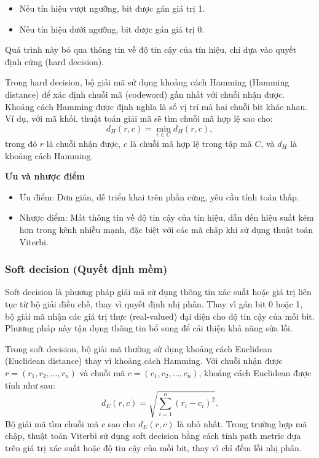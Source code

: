 \begin{itemize}[label=-]
	\item Nếu tín hiệu vượt ngưỡng, bit được gán giá trị 1.
	\item Nếu tín hiệu dưới ngưỡng, bit được gán giá trị 0.
\end{itemize}
Quá trình này bỏ qua thông tin về độ tin cậy của tín hiệu, chỉ dựa vào quyết định cứng (hard decision).

Trong hard decision, bộ giải mã sử dụng khoảng cách Hamming (Hamming distance) để xác định chuỗi mã (codeword) gần nhất với chuỗi nhận được. Khoảng cách Hamming được định nghĩa là số vị trí mà hai chuỗi bit khác nhau. Ví dụ, với mã khối, thuật toán giải mã sẽ tìm chuỗi mã hợp lệ sao cho:
\[
d_H({r}, {c}) = \min_{{c} \in C} d_H({r}, {c}),
\]
trong đó $r$ là chuỗi nhận được, $c$ là chuỗi mã hợp lệ trong tập mã $C$, và $d_H$ là khoảng cách Hamming.

\textbf{Ưu và nhược điểm}

\begin{itemize}[label=-]
	\item Ưu điểm: Đơn giản, dễ triển khai trên phần cứng, yêu cầu tính toán thấp.
	\item Nhược điểm: Mất thông tin về độ tin cậy của tín hiệu, dẫn đến hiệu suất kém hơn trong kênh nhiễu mạnh, đặc biệt với các mã chập khi sử dụng thuật toán Viterbi.
\end{itemize}

\subsubsection{Soft decision (Quyết định mềm)}

Soft decision là phương pháp giải mã sử dụng thông tin xác suất hoặc giá trị liên tục từ bộ giải điều chế, thay vì quyết định nhị phân. Thay vì gán bit 0 hoặc 1, bộ giải mã nhận các giá trị thực (real-valued) đại diện cho độ tin cậy của mỗi bit. Phương pháp này tận dụng thông tin bổ sung để cải thiện khả năng sửa lỗi.

Trong soft decision, bộ giải mã thường sử dụng khoảng cách Euclidean (Euclidean distance) thay vì khoảng cách Hamming. Với chuỗi nhận được ${r} = (r_1, r_2, \ldots, r_n)$ và chuỗi mã ${c} = (c_1, c_2, \ldots, c_n)$, khoảng cách Euclidean được tính như sau:
\[
d_E({r}, {c}) = \sqrt{\sum_{i=1}^n (r_i - c_i)^2}.
\]
Bộ giải mã tìm chuỗi mã ${c}$ sao cho $d_E({r}, {c})$ là nhỏ nhất. Trong trường hợp mã chập, thuật toán Viterbi sử dụng soft decision bằng cách tính path metric dựa trên giá trị xác suất hoặc độ tin cậy của mỗi bit, thay vì chỉ đếm lỗi nhị phân.

